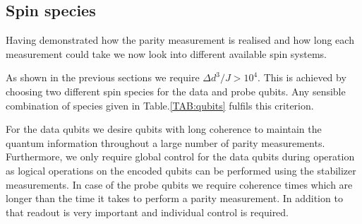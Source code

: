 
\subsection{Spin species}

Having demonstrated how the parity measurement is realised and how long each measurement could take we now look into different available spin systems. 

As shown in the previous sections we require $\Delta d^3/ J > 10^4$. This is achieved by choosing two different spin species for the data and probe qubits. Any sensible combination of species given in Table.\@ \ref*{TAB:qubits} fulfils this criterion.

For the data qubits we desire qubits with long coherence to maintain the quantum information throughout a large number of parity measurements. Furthermore, we only require global control for the data qubits during operation as logical operations on the encoded qubits can be performed using the stabilizer measurements.
In case of the probe qubits we require coherence times which are longer than the time it takes to perform a parity measurement. In addition to that readout is very important and individual control is required.

